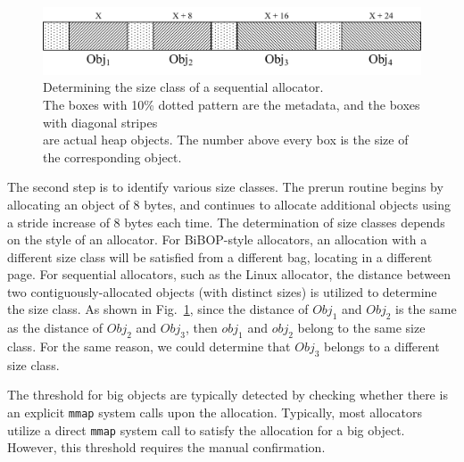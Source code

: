 \begin{figure}[!ht]
\centering
\includegraphics[width=5in]{figures/sequentialclasssize}
\caption{Determining the size class of a sequential allocator. \\The boxes with 10\% dotted pattern are the metadata, and the boxes with diagonal stripes\\ are actual heap objects. The number above every box is the size of the corresponding object. \label{fig:sizeclass}}
\end{figure}

The second step is to identify various size classes. The prerun routine begins by allocating an object of 8 bytes, and continues to allocate additional objects using a stride increase of 8 bytes each time. The determination of size classes depends on the style of an allocator. For BiBOP-style allocators, an allocation with a different size class will be satisfied from a different bag, locating in a different page. For sequential allocators, such as the Linux allocator, the distance between two  contiguously-allocated objects (with distinct sizes) is utilized to determine the size class. As shown in Fig.~\ref{fig:sizeclass}, since the distance of $Obj_1$ and $Obj_2$ is the same as the distance of $Obj_2$ and $Obj_3$, then $obj_1$ and $obj_2$ belong to the same size class. For the same reason, we could determine that $Obj_3$ belongs to a different size class.  

The threshold for big objects are typically detected by checking whether there is an explicit \texttt{mmap} system calls upon the allocation. Typically, most allocators utilize a direct \texttt{mmap} system call to satisfy the allocation for a big object. However, this threshold requires the manual confirmation. 


